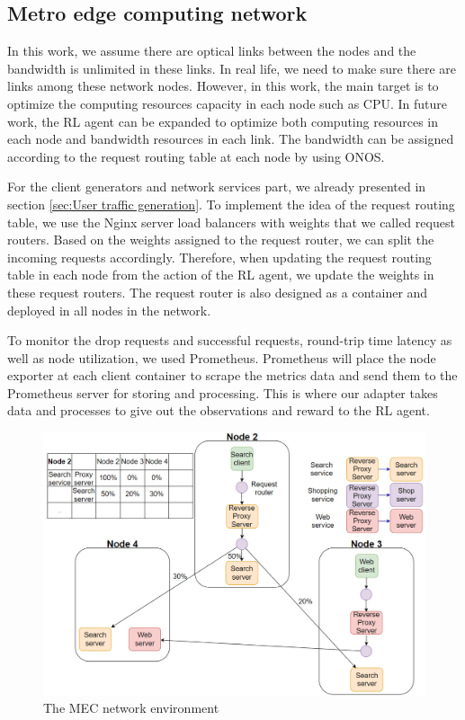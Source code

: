 \documentclass[conference]{IEEEtran}
\begin{document}
\subsection{Metro edge computing network}

In this work, we assume there are optical links between the nodes and the bandwidth is unlimited in these links. In real life, we need to make sure there are links among these network nodes. However, in this work, the main target is to optimize the computing resources capacity in each node such as CPU. In future work, the RL agent can be expanded to optimize both computing resources in each node and bandwidth resources in each link. The bandwidth can be assigned according to the request routing table at each node by using ONOS.

For the client generators and network services part, we already presented in section \ref{sec:User traffic generation}. To implement the idea of the request routing table, we use the Nginx server load balancers with weights that we called request routers. Based on the weights assigned to the request router, we can split the incoming requests accordingly. Therefore, when updating the request routing table in each node from the action of the RL agent, we update the weights in these request routers. The request router is also designed as a container and deployed in all nodes in the network. 

To monitor the drop requests and successful requests, round-trip time latency as well as node utilization, we used Prometheus. Prometheus will place the node exporter at each client container to scrape the metrics data and send them to the Prometheus server for storing and processing. This is where our adapter takes data and processes to give out the observations and reward to the RL agent. 

\begin{figure}[]
    \centering
    \includegraphics[scale = 0.28]{imgs/metro_network_env_client_services_router.png}
    \caption{The MEC network environment}
    \label{fig:metro_network_env_client_services_router}
\end{figure}
\end{document}
